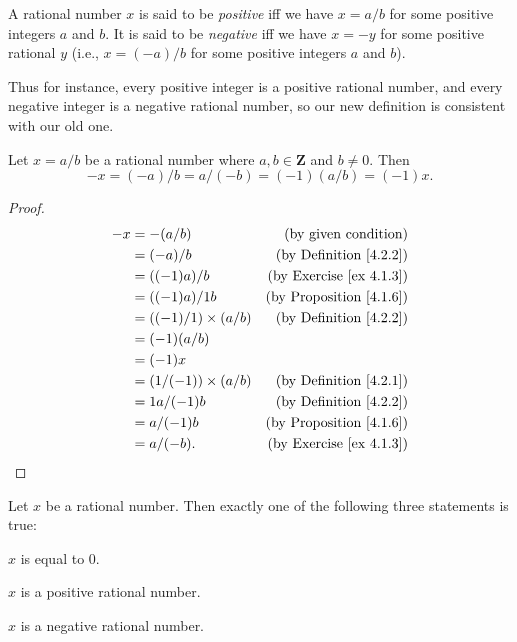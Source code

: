 \begin{definition}\label{4.2.6}
A rational number \(x\) is said to be \emph{positive} iff we have \(x = a / b\) for some positive integers \(a\) and \(b\).
It is said to be \emph{negative} iff we have \(x = -y\) for some positive rational \(y\)
(i.e., \(x = (-a) / b\) for some positive integers \(a\) and \(b\)).
\end{definition}

\begin{note}
Thus for instance, every positive integer is a positive rational number, and every negative integer is a negative rational number, so our new definition is consistent with our old one.
\end{note}

\begin{additional corollary}\label{ac 4.2.3}
Let \(x = a / b\) be a rational number where \(a, b \in \mathbf{Z}\) and \(b \neq 0\).
Then
\[
    -x = (-a) / b = a / (-b) = (-1)(a / b) = (-1)x.
\]
\end{additional corollary}

\begin{proof}
\begin{align*}
-x &= -(a / b) & \text{(by given condition)} \\
&= (-a) / b & \text{(by Definition \ref{4.2.2})} \\
&= ((-1)a) / b & \text{(by Exercise \ref{ex 4.1.3})} \\
&= ((-1)a) / 1b & \text{(by Proposition \ref{4.1.6})} \\
&= ((-1) / 1) \times (a / b) & \text{(by Definition \ref{4.2.2})} \\
&= (-1)(a / b) \\
&= (-1)x \\
&= (1 / (-1)) \times (a / b) & \text{(by Definition \ref{4.2.1})} \\
&= 1a / (-1)b & \text{(by Definition \ref{4.2.2})} \\
&= a / (-1)b & \text{(by Proposition \ref{4.1.6})} \\
&= a / (-b). & \text{(by Exercise \ref{ex 4.1.3})}
\end{align*}
\end{proof}

\begin{lemma}\label{4.2.7}
Let \(x\) be a rational number.
Then exactly one of the following three statements is true:
\begin{enumerate*}
    \item \(x\) is equal to \(0\).
    \item \(x\) is a positive rational number.
    \item \(x\) is a negative rational number.
\end{enumerate*}
\end{lemma}


